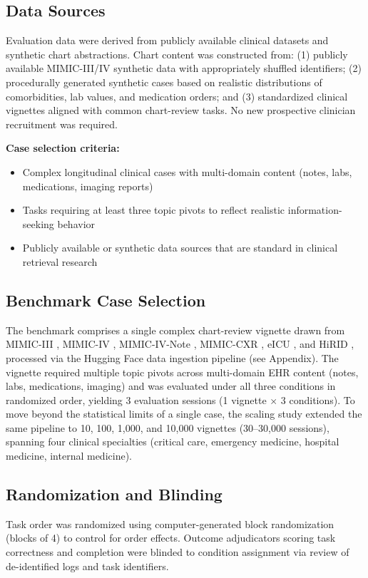 \documentclass[preprint,12pt]{elsarticle}
\begin{document}
\subsection{Data Sources}
Evaluation data were derived from publicly available clinical datasets and synthetic chart abstractions. Chart content was constructed from: (1) publicly available MIMIC-III/IV synthetic data with appropriately shuffled identifiers; (2) procedurally generated synthetic cases based on realistic distributions of comorbidities, lab values, and medication orders; and (3) standardized clinical vignettes aligned with common chart-review tasks. No new prospective clinician recruitment was required.

\textbf{Case selection criteria:}
\begin{itemize}
  \item Complex longitudinal clinical cases with multi-domain content (notes, labs, medications, imaging reports)
  \item Tasks requiring at least three topic pivots to reflect realistic information-seeking behavior
  \item Publicly available or synthetic data sources that are standard in clinical retrieval research
\end{itemize}

\subsection{Benchmark Case Selection}
The benchmark comprises a single complex chart-review vignette drawn from MIMIC-III \citep{johnson2016_mimic3}, MIMIC-IV \citep{pollard2018_mimic4}, MIMIC-IV-Note \citep{johnson2023_mimiciv_note}, MIMIC-CXR \citep{johnson2019_mimic_cxr}, eICU \citep{pollard2018_eicu}, and HiRID \citep{muller2021_hirid}, processed via the Hugging Face data ingestion pipeline (see Appendix). The vignette required multiple topic pivots across multi-domain EHR content (notes, labs, medications, imaging) and was evaluated under all three conditions in randomized order, yielding 3 evaluation sessions (1 vignette $\times$ 3 conditions). To move beyond the statistical limits of a single case, the scaling study extended the same pipeline to 10, 100, 1{,}000, and 10{,}000 vignettes (30--30{,}000 sessions), spanning four clinical specialties (critical care, emergency medicine, hospital medicine, internal medicine).

\subsection{Randomization and Blinding}
Task order was randomized using computer-generated block randomization (blocks of 4) to control for order effects. Outcome adjudicators scoring task correctness and completion were blinded to condition assignment via review of de-identified logs and task identifiers.
\end{document}
